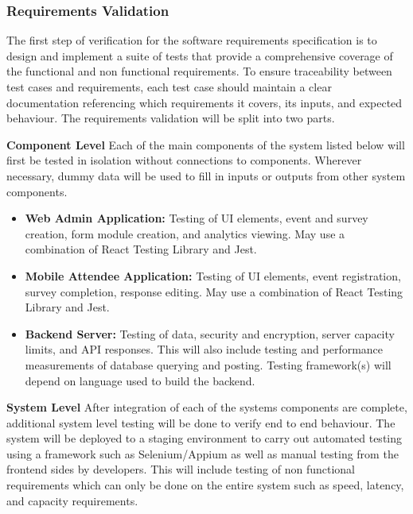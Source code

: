 \documentclass[12pt, titlepage]{article}
\begin{document}
\subsubsection{Requirements Validation}
The first step of verification for the software requirements specification is to design and implement a suite of tests that provide a comprehensive coverage of the functional and non functional requirements. To ensure traceability between test cases and requirements, each test case should maintain a clear documentation referencing which requirements it covers, its inputs, and expected behaviour. The requirements validation will be split into two parts. 

\textbf{Component Level}
Each of the main components of the system listed below will first be tested in isolation without connections to components. Wherever necessary, dummy data will be used to fill in inputs or outputs from other system components.
\begin{itemize}
  \item \textbf{Web Admin Application:} Testing of UI elements, event and survey creation, form module creation, and analytics viewing. May use a combination of React Testing Library and Jest.
  \item \textbf{Mobile Attendee Application:} Testing of UI elements, event registration, survey completion, response editing. May use a combination of React Testing Library and Jest.
  \item \textbf{Backend Server:} Testing of data, security and encryption, server capacity limits, and API responses. This will also include testing and performance measurements of database querying and posting. Testing framework(s) will depend on language used to build the backend. 
\end{itemize}

\textbf{System Level}
  After integration of each of the systems components are complete, additional system level testing will be done to verify end to end behaviour. The system will be deployed to a staging environment to carry out automated testing using a framework such as Selenium/Appium as well as manual testing from the frontend sides by developers. This will include testing of non functional requirements which can only be done on the entire system such as speed, latency, and capacity requirements.
\end{document}
